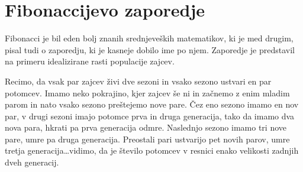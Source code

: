 \documentclass[10pt,a4paper,oneside]{book}
\begin{document}
\section{Fibonaccijevo zaporedje}
Fibonacci je bil eden bolj znanih srednjeveških matematikov, ki je med drugim, pisal tudi o zaporedju, ki je kasneje dobilo ime po njem\cite{liberabaci}. Zaporedje je predstavil na primeru idealizirane rasti populacije zajcev.

Recimo, da vsak par zajcev živi dve sezoni in vsako sezono ustvari en par potomcev. Imamo neko pokrajino, kjer zajcev še ni in začnemo z enim mladim parom in nato vsako sezono preštejemo nove pare. Čez eno sezono imamo en nov par, v drugi sezoni imajo potomce prva in druga generacija, tako da imamo dva nova para, hkrati pa prva generacija odmre. Naslednjo sezono imamo tri nove pare, umre pa druga generacija. Preostali pari ustvarijo pet novih parov, umre tretja generacija\dots vidimo, da je število potomcev v resnici enako velikosti zadnjih dveh generacij.
\end{document}

